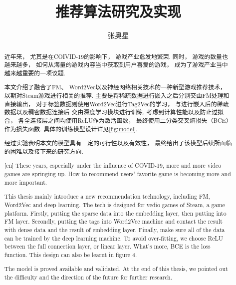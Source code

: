 \documentclass{hainanuthesis}
\title{推荐算法研究及实现}
\author{张奥星}
\begin{document}
\makecover{}

\begin{abstract}
    近年来，
    尤其是在COIVID-19的影响下，
    游戏产业愈发地繁荣.
    同时，
    游戏的数量也越来越多，
    如何从海量的游戏内容当中获取到用户喜爱的游戏，
    成为了游戏产业当中越来越重要的一项议题.

    本文介绍了融合了FM、
    Word2Vec以及神经网络相关技术的一种新型游戏推荐技术，
    以期对Steam游戏进行相关的推荐.
    主要是将稀疏数据进行嵌入之后分别交由FM处理和直接输出，
    对于标签数据则使用Word2Vec进行Tag2Vec的学习，
    与进行嵌入后的稀疏数据以及稠密数据连接后
    交由深度学习模块进行训练.
    考虑到计算性能以及防止过拟合，
    各全连接层之间均使用ReLU作为激活函数，
    最终使用二分类交叉熵损失（BCE）作为损失函数.
    具体的训练模型设计详见\cref{fig:model}.

    经过实验表明本文的模型具有一定的可行性以及有效性，
    最终给出了该模型后续所面临的困难以及接下来的研究方向.
\end{abstract}

\newpage

\begin{abstract}[en]
    These years,
    especially under the influence of COVID-19,
    more and more video games are springing up.
    How to recommend users' favorite game is becoming
    more and more important.

    This thesis mainly introduce a new recommendation technology,
    including FM, Word2Vec and deep learning.
    The tech is designed for vedio games of Steam,
    a game platform.
    Firstly,
    putting the sparse data into the embedding layer,
    then putting into FM layer.
    Secondly,
    putting the tags into Word2Vec machine and
    contact the result with dense data and
    the result of embedding layer.
    Finally,
    make sure all of the data can be trained by
    the deep learning machine.
    To avoid over-fitting,
    we choose ReLU between the full connection layer,
    or linear layer.
    What's more,
    BCE is the loss function.
    This design can also be learnt in figure 4.

    The model is proved available and validated.
    At the end of this thesis,
    we pointed out the difficulty and
    the direction of the future for further research.
\end{abstract}

\newpage
\tableofcontents
\newpage















\begin{acknowledge}
\end{acknowledge}

\printbib{}
\end{document}
